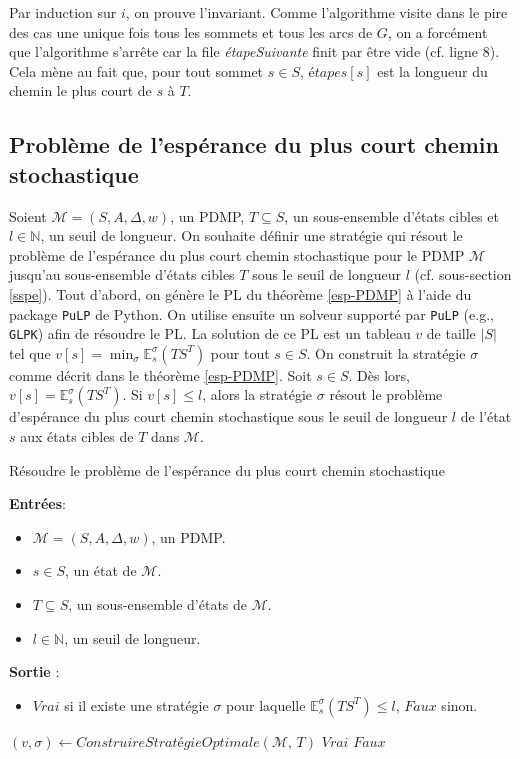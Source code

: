 \documentclass[12pt,a4paper]{report}
\theoremstyle{definition}%
\theoremstyle{remark}
\let\labelitemi\labelitemii
\begin{document}
Par induction sur $i$, on prouve l'invariant. Comme l'algorithme visite
dans le pire des cas une unique fois tous les sommets et tous les arcs de $G$,
on a forcément que l'algorithme s'arrête car la file \textit{étapeSuivante}
finit par être vide (cf. ligne 8). Cela mène au fait que, pour tout sommet $s \in S$,
$\textit{étapes}[s]$ est la longueur du chemin le plus court de $s$ à $T$.

\subsection{Problème de l'espérance du plus court chemin stochastique}
Soient $\mathcal{M} = (S, A, \Delta, w)$, un PDMP, $T \subseteq S$, un
sous-ensemble d'états cibles et $l \in \mathbb{N}$, un seuil de longueur.
On souhaite définir une stratégie qui résout le problème de l'espérance du plus
court chemin stochastique pour le PDMP $\mathcal{M}$ jusqu'au sous-ensemble
d'états cibles $T$ sous le seuil de longueur $l$ (cf. sous-section \ref{sspe}).
Tout d'abord, on génère le PL du théorème \ref{esp-PDMP} à l'aide du package
\verb|PuLP| de Python. On utilise ensuite un solveur supporté par \verb|PuLP| (e.g., \verb|GLPK|)
afin de résoudre le PL. La solution de ce PL est un tableau $v$ de taille
$|S|$ tel que $v[s] = \min_{\sigma} \mathbb{E}_s^\sigma(TS^T)$ pour
tout $s \in S$. On construit la stratégie $\sigma$ comme décrit dans
le théorème \ref{esp-PDMP}. Soit $s \in S$. Dès lors, $v[s] =
\mathbb{E}_s^\sigma(TS^T)$. Si $v[s] \leq l$, alors la stratégie
$\sigma$ résout le problème d'espérance du plus court chemin stochastique
sous le seuil de longueur $l$ de l'état $s$ aux états cibles de $T$ dans
$\mathcal{M}$.

\begin{algorithm}[H]
\caption{Résoudre le problème de l'espérance du plus court chemin stochastique}
\hspace*{\algorithmicindent} \textbf{Entrées}:
	\begin{itemize}
		\renewcommand{\labelitemi}{\tiny$\bullet$}
		\item $\mathcal{M} = (S, A, \Delta, w)$, un PDMP.
		\item $s \in S$, un état de $\mathcal{M}$.
		\item $T \subseteq S$, un sous-ensemble d'états de $\mathcal{M}$.
		\item $l \in \mathbb{N}$, un seuil de longueur.
	\end{itemize}
\hspace*{\algorithmicindent} \textbf{Sortie} :
\begin{itemize}
	\renewcommand{\labelitemi}{\tiny$\bullet$}
	\item $Vrai$ si il existe une stratégie $\sigma$ pour laquelle $\mathbb{E}^{\sigma}_s (TS^T) \leq l$, $Faux$ sinon.
\end{itemize}
\begin{algorithmic}[1]
\STATE $(v, \sigma) \gets \textit{ConstruireStratégieOptimale}(\mathcal{M}, \, T)$
	\RETURN $Vrai$
\ELSE
	\RETURN $Faux$
\ENDIF
\end{algorithmic}
\end{algorithm}
\end{document}
